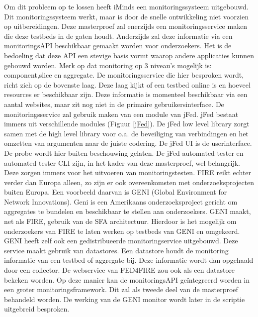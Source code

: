 \npar
Om dit probleem op te lossen heeft iMinds een monitoringssysteem uitgebouwd\citep{fed4fire-second-fed-arch}. Dit monitoringssysteem werkt, maar is door de snelle ontwikkeling niet voorzien op uitbereidingen. Deze masterproef zal enerzijds een monitoringsservice maken die deze testbeds in de gaten houdt. Anderzijds zal deze informatie via een monitoringsAPI beschikbaar gemaakt worden voor onderzoekers. Het is de bedoeling dat deze API een stevige basis vormt waarop andere applicaties kunnen gebouwd worden. Merk op dat monitoring op 3 niveau's mogelijk is: component,slice en aggregate. De monitoringsservice die hier besproken wordt, richt zich op de bovenste laag. Deze laag kijkt of een testbed online is en hoeveel resources er beschikbaar zijn. Deze informatie is momenteel beschikbaar via een aantal websites, maar zit nog niet in de primaire gebruikersinterface.
\npar
De monitoringsservice zal gebruik maken van een module van jFed.
jFed bestaat immers uit verschillende modules (Figuur \ref{jFed}).
De jFed low level library zorgt samen met de high level library voor o.a. de beveiliging van verbindingen en het omzetten van argumenten naar de juiste codering. De jFed UI is de userinterface. De probe wordt hier buiten beschouwing gelaten. De jFed automated tester en automated tester CLI zijn, in het kader van deze masterproef, wel belangrijk. Deze zorgen immers voor het uitvoeren van monitoringstesten.
\clearpage
\npar
FIRE reikt echter verder dan Europa alleen, zo zijn er ook overeenkomsten met onderzoeksprojecten buiten Europa. Een voorbeeld daarvan is GENI (Global Environment for Network Innovations). Geni is een Amerikaans onderzoeksproject gericht om aggregates te bundelen en beschikbaar te stellen aan onderzoekers\citep{geni-what-is}. GENI maakt, net als FIRE, gebruik van de SFA architectuur\citep{geni-sfa}. Hierdoor is het mogelijk om onderzoekers van FIRE te laten werken op testbeds van GENI en omgekeerd.
\npar
GENI heeft zelf ook een gedistribueerde monitoringservice uitgebouwd\citep{geni-monitor}. Deze service maakt gebruik van datastores\citep{geni-overview}. Een datastore houdt de monitoring informatie van een testbed of aggregate bij. Deze informatie wordt dan opgehaald door een collector. De webservice van FED4FIRE zou ook als een datastore bekeken worden. Op deze manier kan de monitoringsAPI ge\"integreerd worden in een groter monitoringsframework. Dit zal als tweede deel van de masterproef behandeld worden. De werking van de GENI monitor wordt later in de scriptie uitgebreid besproken.
